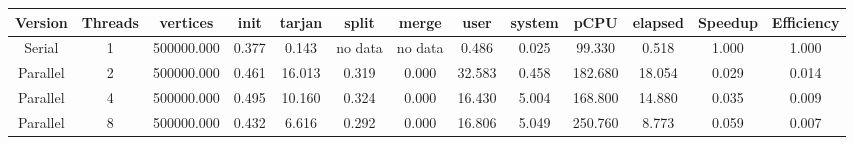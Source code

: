 \begin{tabular}{|c|c|c|c|c|c|c|c|c|c|c|c|c|}
\toprule
 Version &  Threads &   vertices &  init &  tarjan &   split &   merge &   user &  system &    pCPU &  elapsed &  Speedup &  Efficiency \\
\midrule
  Serial &        1 & 500000.000 & 0.377 &   0.143 & no data & no data &  0.486 &   0.025 &  99.330 &    0.518 &    1.000 &       1.000 \\
Parallel &        2 & 500000.000 & 0.461 &  16.013 &   0.319 &   0.000 & 32.583 &   0.458 & 182.680 &   18.054 &    0.029 &       0.014 \\
Parallel &        4 & 500000.000 & 0.495 &  10.160 &   0.324 &   0.000 & 16.430 &   5.004 & 168.800 &   14.880 &    0.035 &       0.009 \\
Parallel &        8 & 500000.000 & 0.432 &   6.616 &   0.292 &   0.000 & 16.806 &   5.049 & 250.760 &    8.773 &    0.059 &       0.007 \\
\bottomrule
\end{tabular}
